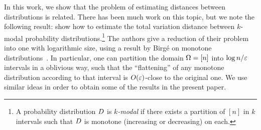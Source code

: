 In this work, we show that the problem of estimating distances
between distributions is related. There has been much work on this
topic, but we note the following result:
\cite{DDSVV:13} show how to estimate the total 
variation distance between $k$-modal probability distributions.\footnote{A probability distribution $D$ is \emph{$k$-modal} if there exists a partition of $[n]$ in $k$ intervals such that $D$ is monotone (increasing or decreasing) on each.}
The authors give a reduction of their problem into one with logarithmic size, 
using a result by Birg\'e on monotone distributions~\cite{Birge:87}. In particular, 
one can partition the domain ${\Omega}=[n]$ into $\log n/\varepsilon$ intervals in a oblivious way, 
such that the ``flattening'' of any monotone distribution according 
to that interval is $\bigO{\eps}$-close to the original one. 
We use similar ideas in order to obtain some of the results in the present paper. 

    


